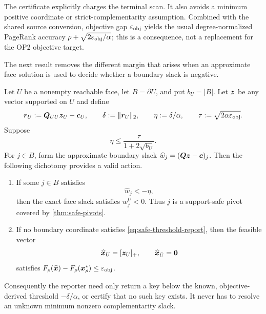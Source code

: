 The certificate explicitly charges the terminal scan.  It also avoids a
minimum positive coordinate or strict-complementarity assumption.  Combined
with the shared source conversion, objective gap $\varepsilon_{\mathrm{obj}}$ yields the usual
degree-normalized PageRank accuracy
$\rho+\sqrt{2\varepsilon_{\mathrm{obj}}/\alpha}$; this is a consequence, not a replacement for
the OP2 objective target.

The next result removes the different margin that arises when an approximate
face solution is used to decide whether a boundary slack is negative.

\begin{theorem}
\label{thm:threshold-dichotomy}
Let $U$ be a nonempty reachable face, let $B=\partial U$, and put
$b_U=|B|$.  Let $\bm{z}$ be any vector supported on $U$ and define
\begin{equation}
 \bm{r}_U:=\bm{Q}_{UU}\bm{z}_U-\bm{c}_U,
 \qquad
 \delta:=\lVert\bm{r}_U\rVert_2,
 \qquad
 \eta:=\delta/\alpha,
 \qquad
 \tau:=\sqrt{2\alpha\varepsilon_{\mathrm{obj}}}.
 \label{eq:threshold-parameters}
\end{equation}
Suppose
\begin{equation}
 \eta\leq \frac{\tau}{1+2\sqrt{b_U}}.
 \label{eq:face-residual-target}
\end{equation}
For $j\in B$, form the approximate boundary slack
$\widehat w_j=(\bm{Q}\bm{z}-\bm{c})_j$.  Then the following dichotomy provides a
valid action.
\begin{enumerate}[label=(\roman*)]
\item If some $j\in B$ satisfies
\begin{equation}
 \widehat w_j<-\eta,
 \label{eq:safe-threshold-report}
\end{equation}
then the exact face slack satisfies $w_j^U<0$.  Thus $j$ is a support-safe
pivot covered by \cref{thm:safe-pivots}.
\item If no boundary coordinate satisfies \cref{eq:safe-threshold-report},
then the feasible vector
\begin{equation}
 \widehat{\bm{x}}_U=[\bm{z}_U]_+,
 \qquad
 \widehat{\bm{x}}_{\bar U}=\bm{0}
 \label{eq:threshold-output}
\end{equation}
satisfies
$F_\rho(\widehat{\bm{x}})-F_\rho(\bm{x}_\rho^*)\leq\varepsilon_{\mathrm{obj}}$.
\end{enumerate}
Consequently the reporter need only return a key below the known,
objective-derived threshold $-\delta/\alpha$, or certify that no such key
exists.  It never has to resolve an unknown minimum nonzero complementarity
slack.
\end{theorem}

